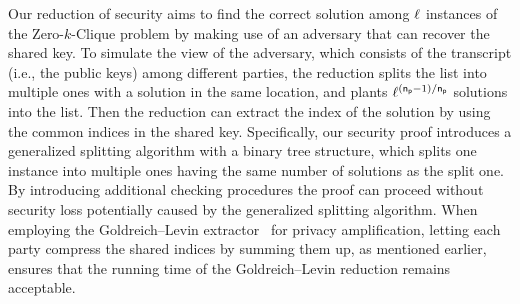 
Our reduction of security aims to find the correct solution among $\ell$ instances of the Zero-$k$-Clique problem by making use of an adversary that can recover the shared key. To simulate the view of the adversary, which consists of the transcript (i.e., the public keys) among different parties, the reduction splits the list into multiple ones with a solution in the same location, and plants $\ell^{(\mathsf{n_p}-1)/\mathsf{n_p}}$ solutions into the list. Then the reduction can extract the index of the solution by using the common indices in the shared key.
Specifically, our security proof introduces a generalized splitting algorithm with a binary tree structure, which splits one instance into multiple ones having the same number of solutions as the split one. %
By introducing additional checking procedures the proof can proceed without security loss potentially caused by the generalized splitting algorithm. When employing the Goldreich--Levin extractor~\cite{GL89} for privacy amplification, letting each party compress the shared indices by summing them up, as mentioned earlier, ensures that the running time of the Goldreich--Levin reduction remains acceptable.

